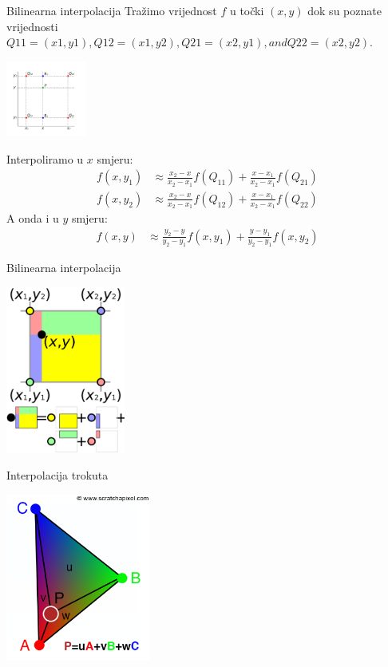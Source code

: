 \documentclass[9pt]{beamer}
\begin{document}
\begin{frame}{Bilinearna interpolacija}
	Tražimo vrijednost $f$ u točki $(x, y)$ dok su poznate vrijednosti $Q11 = (x1, y1), Q12 = (x1, y2), Q21 = (x2, y1), and Q22 = (x2, y2)$. 
	\begin{center}
		\includegraphics[height=2.5cm]{./slike/bilinear_interpolation.png}
	\end{center}
	Interpoliramo u $x$ smjeru:
	\begin{align*}
	f(x, y_1) & \approx \frac{x_2 - x}{x_2 - x_1} f(Q_{11}) + 
	            \frac{x - x_1}{x_2 - x_1} f(Q_{21}) \\
	f(x, y_2) & \approx \frac{x_2 - x}{x_2 - x_1} f(Q_{12}) + 
	            \frac{x - x_1}{x_2 - x_1} f(Q_{22})
	\end{align*}
	A onda i u $y$ smjeru:
	\begin{align*}
		f(x, y) & \approx \frac{y_2 - y}{y_2 - y_1} f(x, y_1) +
		           \frac{y - y_1}{y_2 - y_1} f(x, y_2)
	\end{align*}
\end{frame}
\begin{frame}{Bilinearna interpolacija}
	\begin{center}
		\includegraphics[height=5.5cm]{./slike/bilinear_interpolation_2.png}
	\end{center}
\end{frame}

\begin{frame}{Interpolacija trokuta}
	\begin{center}
		\includegraphics[height=5.5cm]{./slike/barycentriccolor.png}
	\end{center}
\end{frame}
\end{document}
